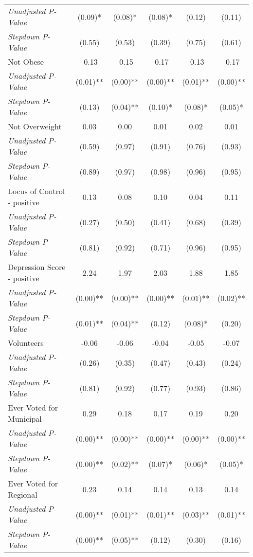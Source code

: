 \begin{tabular}{l c c c c c}
\quad \textit{Unadjusted P-Value} & (0.09)* & (0.08)* & (0.08)* & (0.12) & (0.11) \\
\quad \textit{Stepdown P-Value} & (0.55) & (0.53) & (0.39) & (0.75) & (0.61) \\
Not Obese & -0.13 & -0.15 & -0.17 & -0.13 & -0.17 \\
\quad \textit{Unadjusted P-Value} & (0.01)** & (0.00)** & (0.00)** & (0.01)** & (0.00)** \\
\quad \textit{Stepdown P-Value} & (0.13) & (0.04)** & (0.10)* & (0.08)* & (0.05)* \\
Not Overweight & 0.03 & 0.00 & 0.01 & 0.02 & 0.01 \\
\quad \textit{Unadjusted P-Value} & (0.59) & (0.97) & (0.91) & (0.76) & (0.93) \\
\quad \textit{Stepdown P-Value} & (0.89) & (0.97) & (0.98) & (0.96) & (0.95) \\
Locus of Control - positive & 0.13 & 0.08 & 0.10 & 0.04 & 0.11 \\
\quad \textit{Unadjusted P-Value} & (0.27) & (0.50) & (0.41) & (0.68) & (0.39) \\
\quad \textit{Stepdown P-Value} & (0.81) & (0.92) & (0.71) & (0.96) & (0.95) \\
Depression Score - positive & 2.24 & 1.97 & 2.03 & 1.88 & 1.85 \\
\quad \textit{Unadjusted P-Value} & (0.00)** & (0.00)** & (0.00)** & (0.01)** & (0.02)** \\
\quad \textit{Stepdown P-Value} & (0.01)** & (0.04)** & (0.12) & (0.08)* & (0.20) \\
Volunteers & -0.06 & -0.06 & -0.04 & -0.05 & -0.07 \\
\quad \textit{Unadjusted P-Value} & (0.26) & (0.35) & (0.47) & (0.43) & (0.24) \\
\quad \textit{Stepdown P-Value} & (0.81) & (0.92) & (0.77) & (0.93) & (0.86) \\
Ever Voted for Municipal & 0.29 & 0.18 & 0.17 & 0.19 & 0.20 \\
\quad \textit{Unadjusted P-Value} & (0.00)** & (0.00)** & (0.00)** & (0.00)** & (0.00)** \\
\quad \textit{Stepdown P-Value} & (0.00)** & (0.02)** & (0.07)* & (0.06)* & (0.05)* \\
Ever Voted for Regional & 0.23 & 0.14 & 0.14 & 0.13 & 0.14 \\
\quad \textit{Unadjusted P-Value} & (0.00)** & (0.01)** & (0.01)** & (0.03)** & (0.01)** \\
\quad \textit{Stepdown P-Value} & (0.00)** & (0.05)** & (0.12) & (0.30) & (0.16) \\

\end{tabular}
